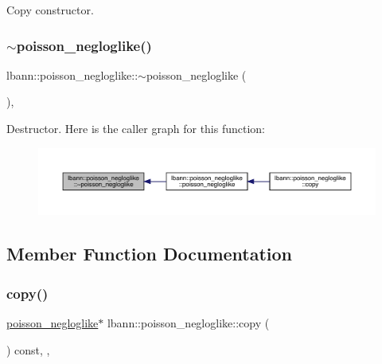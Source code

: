 Copy constructor. \mbox{\label{classlbann_1_1poisson__negloglike_abf677df47c894d197b2ac55d08ff109c}} 
\subsubsection{\texorpdfstring{$\sim$poisson\+\_\+negloglike()}{~poisson\_negloglike()}}
{\footnotesize\ttfamily lbann\+::poisson\+\_\+negloglike\+::$\sim$poisson\+\_\+negloglike (\begin{DoxyParamCaption}{ }\end{DoxyParamCaption})\hspace{0.3cm}{\ttfamily [override]}, {\ttfamily [default]}}

Destructor. Here is the caller graph for this function\+:\nopagebreak
\begin{figure}[H]
\begin{center}
\leavevmode
\includegraphics[width=350pt]{classlbann_1_1poisson__negloglike_abf677df47c894d197b2ac55d08ff109c_icgraph}
\end{center}
\end{figure}


\subsection{Member Function Documentation}
\mbox{\label{classlbann_1_1poisson__negloglike_a0c24847ce45940d823e27b274fb8b5c4}} 
\subsubsection{\texorpdfstring{copy()}{copy()}}
{\footnotesize\ttfamily \hyperlink{classlbann_1_1poisson__negloglike}{poisson\+\_\+negloglike}$\ast$ lbann\+::poisson\+\_\+negloglike\+::copy (\begin{DoxyParamCaption}{ }\end{DoxyParamCaption}) const\hspace{0.3cm}{\ttfamily [inline]}, {\ttfamily [override]}, {\ttfamily [virtual]}}

